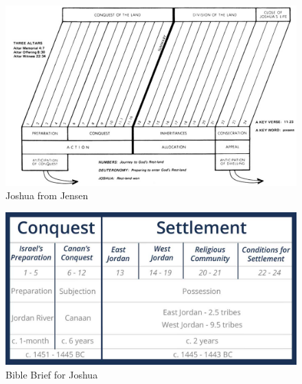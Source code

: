 \newpage
\begin{figure}
\begin{center}
\includegraphics[scale=2, angle=90]{06OT-Joshua/References/9.Jensen-Joshua.png}
\caption[Joshua from Jensen]{Joshua from Jensen}
\label{fig:Joshua from Jensen}
\end{center}
\end{figure}


\newpage
\begin{figure}
\begin{center}
\includegraphics[scale=.5, angle=90]{06OT-Joshua/References/10.Bible-Brief-Joshua.jpg}
\caption[Bible Brief for Joshua]{Bible Brief for Joshua}
\label{fig:Bible Brief for Joshua}
\end{center}
\end{figure}

